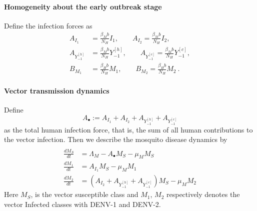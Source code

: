 
    \paragraph{Homogeneity about the early outbreak stage}

    Define the infection forces as
    \begin{equation}
        \begin{aligned}
            A_{I_1} &=
                \frac{\beta_Mb}{N_H} I_1, \qquad
            A_{I_2}=
                \frac{\beta_Mb}{N_H} I_2,
        \\
            A_{Y_{-1}^{[h]}}&=
            \frac{\beta_Mb}{N_H} Y_{-1} ^{[h]}, \qquad
            A_{Y_{-1}^{[c]}}=
                \frac{\beta_Mb}{N_H} Y_{-1}^{[c]},
        \\
            B_{M_1} &= 
                \frac{\beta_Hb}{N_H}M_1, \qquad
            B_{M_2}=
                \frac{\beta_Hb}{N_H}M_2 ~.
        \end{aligned}
    \end{equation}
    \paragraph{Vector transmission dynamics}
    Define
    $$
        A_{\bullet}:=
            A_{I_1} + A_{I_2} + A_{Y_{-1}^{[h]}} + 
            A_{Y_{-1}^{[c]}}
    $$
    as the total human infection force, that is, 
    the sum of all
    human contributions to the vector infection. 
    Then we describe the mosquito disease dynamics 
    by 
    \begin{equation}
        \begin{aligned}
            \\
            \frac{dM_S}{dt}&=
                \Lambda_M
                - A_{\bullet} M_S
                - \mu_M M_S
            \\
            \frac{dM_1}{dt}&=
                A_{I_1}  M_S - \mu_M M_1
            \\
            \frac{dM_2}{dt} &=
                \left(
                    A_{I_2}+A_{Y_{-1}^{[h]}}+A_{Y_{-1}^{[c]}}
                \right) 
                M_S-\mu_M M_2
        \end{aligned}
    \end{equation}
    Here $M_S$, is the vector susceptible class and
    $M_1$, $M_2$ respectively denotes the vector 
    Infected classes with \ac{DENV-1}
    and \ac{DENV-2}.
